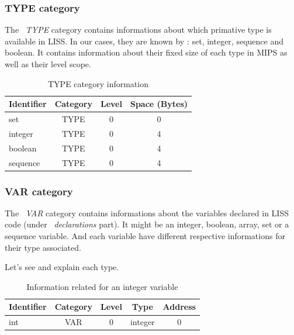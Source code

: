 \documentclass[
  oneside,
  11pt, a4paper,
  footinclude=true,
  headinclude=true,
  cleardoublepage=empty
]{scrbook}
\begin{document}
\subsubsection{TYPE category}

The ~\textit{TYPE} category contains informations about which primative type is available in LISS. In our cases, they are known by : set, integer, sequence and boolean. 
It contains information about their fixed size of each type in MIPS as well as their level scope.

\begin{table}[h!]
\centering
\caption{TYPE category information}
\label{tbl:type_category_information}
\begin{tabular}{l|c|c|c}
\multicolumn{1}{c|}{Identifier} & \multicolumn{1}{l|}{Category} & \multicolumn{1}{l|}{Level} & \multicolumn{1}{l}{Space (Bytes)} \\ \hline
set                             & TYPE                          & 0                          & 0                                 \\ \hline
integer                         & TYPE                          & 0                          & 4                                 \\ \hline
boolean                         & TYPE                          & 0                          & 4                                 \\ \hline
sequence                        & TYPE                          & 0                          & 4                                
\end{tabular}
\end{table}

\subsubsection{VAR category}

The ~\textit{VAR} category contains informations about the variables declared in LISS code (under ~\textit{declarations} part). It might be an integer, boolean, array, set or a sequence variable.
And each variable have different respective informations for their type associated.

Let's see and explain each type.

\begin{table}[h!]
\centering
\caption{Information related for an integer variable}
\label{tbl:var_integer_information}
\begin{tabular}{l|c|c|c|c}
\multicolumn{1}{c|}{Identifier} & Category & Level & Type    & Address \\ \hline
int                             & VAR      & 0     & integer & 0      
\end{tabular}
\end{table}
\end{document}
